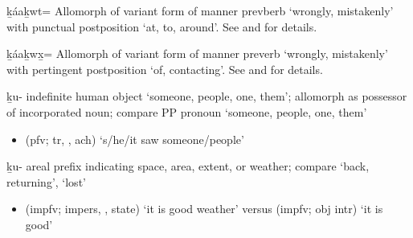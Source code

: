 \begin{morphdesc}[resume*=alphalist]
\item[ḵáaḵwt=]\label{m:ḵáaḵwt=}
	Allomorph of variant form  of manner prevberb  ‘wrongly, mistakenly’
		with punctual postposition  ‘at, to, around’.
	See  and  for details.

\item[ḵáaḵwx̱=]\label{m:ḵáaḵwx̱=}
	Allomorph of variant form  of manner preverb  ‘wrongly, mistakenly’
		with pertingent postposition  ‘of, contacting’.
	See  and  for details.

\item[ḵu-]\label{m:ḵu-indef}
	indefinite human object ‘someone, people, one, them’;
	allomorph  as possessor of incorporated noun;
	compare PP pronoun  ‘someone, people, one, them’
	\begin{itemize}
	\item	{} (pfv; tr, , ach) ‘s/he/it saw someone/people’
	\end{itemize}

\item[ḵu-]\label{m:ḵu-areal}
	areal prefix indicating space, area, extent, or weather;
	compare  ‘back, returning’,  ‘lost’
	\begin{itemize}
	\item	{} (impfv; impers, ,  state) ‘it is good weather’\newline
		versus  (impfv; obj intr) ‘it is good’
	\end{itemize}


\end{morphdesc}
